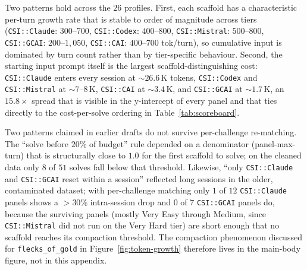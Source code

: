 

Two patterns hold across the $26$ profiles. First, each scaffold has a characteristic per-turn growth rate that is stable to order of magnitude across tiers (\texttt{CSI::Claude}: $300$--$700$, \texttt{CSI::Codex}: $400$--$800$, \texttt{CSI::Mistral}: $500$--$800$, \texttt{CSI::GCAI}: $200$--$1{,}050$, \texttt{CSI::CAI}: $400$--$700$ tok/turn), so cumulative input is dominated by turn count rather than by tier-specific behaviour. Second, the starting input prompt itself is the largest scaffold-distinguishing cost: \texttt{CSI::Claude} enters every session at $\sim\!26.6$\,K tokens, \texttt{CSI::Codex} and \texttt{CSI::Mistral} at $\sim\!7$--$8$\,K, \texttt{CSI::CAI} at $\sim\!3.4$\,K, and \texttt{CSI::GCAI} at $\sim\!1.7$\,K, an $15.8\times$ spread that is visible in the y-intercept of every panel and that ties directly to the cost-per-solve ordering in Table~\ref{tab:scoreboard}.

Two patterns claimed in earlier drafts do not survive per-challenge re-matching. The ``solve before $20\%$ of budget'' rule depended on a denominator (panel-max-turn) that is structurally close to $1.0$ for the first scaffold to solve; on the cleaned data only $8$ of $51$ solves fall below that threshold. Likewise, ``only \texttt{CSI::Claude} and \texttt{CSI::GCAI} reset within a session'' reflected long sessions in the older, contaminated dataset; with per-challenge matching only $1$ of $12$ \texttt{CSI::Claude} panels shows a $>\!30\%$ intra-session drop and $0$ of $7$ \texttt{CSI::GCAI} panels do, because the surviving panels (mostly Very Easy through Medium, since \texttt{CSI::Mistral} did not run on the Very Hard tier) are short enough that no scaffold reaches its compaction threshold. The compaction phenomenon discussed for \texttt{flecks\_of\_gold} in Figure~\ref{fig:token-growth} therefore lives in the main-body figure, not in this appendix.

